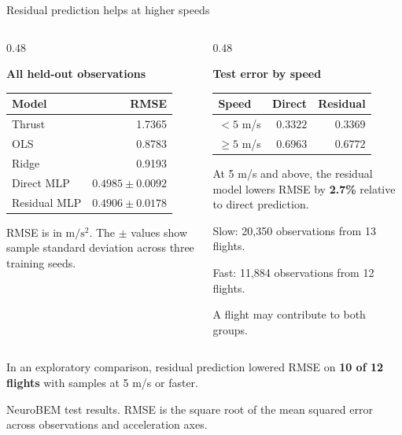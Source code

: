 \documentclass[11pt,aspectratio=169]{beamer}
\newcommand{\source}[1]{\par\vfill{\color{Muted}\fontsize{7}{8.5}\selectfont #1\par}}
\newcommand{\topic}[1]{\par{\color{Teal}\bfseries #1}\par\vspace{0.12cm}}
\begin{document}
\begin{frame}[t]{Residual prediction helps at higher speeds}
\begin{columns}[T,onlytextwidth]
\begin{column}{0.48\textwidth}
\topic{All held-out observations}
\begin{tabular}{lr}
\toprule
Model & RMSE \\
\midrule
Thrust & 1.7365 \\
OLS & 0.8783 \\
Ridge & 0.9193 \\
Direct MLP & $0.4985\pm0.0092$ \\
Residual MLP & $\mathbf{0.4906}\pm0.0178$ \\
\bottomrule
\end{tabular}\par
\par\vspace{0.16cm}
{\small RMSE is in $\mathrm{m/s^2}$. The $\pm$ values show sample standard deviation across three training seeds.}
\end{column}
\begin{column}{0.48\textwidth}
\topic{Test error by speed}
\begin{tabular}{lrr}
\toprule
Speed & Direct & Residual \\
\midrule
$<5$ m/s & $\mathbf{0.3322}$ & 0.3369 \\
$\geq5$ m/s & 0.6963 & $\mathbf{0.6772}$ \\
\bottomrule
\end{tabular}\par
\par\vspace{0.18cm}
At 5 m/s and above, the residual model lowers RMSE by \textbf{2.7\%} relative to direct prediction.
\par\vspace{0.16cm}
{\small Slow: 20,350 observations from 13 flights.\par
Fast: 11,884 observations from 12 flights.\par
A flight may contribute to both groups.}
\end{column}
\end{columns}
\par\vspace{0.16cm}
In an exploratory comparison, residual prediction lowered RMSE on \textbf{10 of 12 flights} with samples at 5 m/s or faster.
\source{NeuroBEM test results. RMSE is the square root of the mean squared error across observations and acceleration axes.}
\end{frame}
\end{document}

